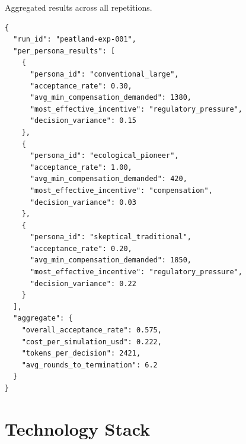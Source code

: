 \documentclass[12pt, a4paper]{article}
\begin{document}
Aggregated results across all repetitions.

\begin{lstlisting}[style=json, caption={Run summary with per-persona results.}, label={lst:runsummary}]
{
  "run_id": "peatland-exp-001",
  "per_persona_results": [
    {
      "persona_id": "conventional_large",
      "acceptance_rate": 0.30,
      "avg_min_compensation_demanded": 1380,
      "most_effective_incentive": "regulatory_pressure",
      "decision_variance": 0.15
    },
    {
      "persona_id": "ecological_pioneer",
      "acceptance_rate": 1.00,
      "avg_min_compensation_demanded": 420,
      "most_effective_incentive": "compensation",
      "decision_variance": 0.03
    },
    {
      "persona_id": "skeptical_traditional",
      "acceptance_rate": 0.20,
      "avg_min_compensation_demanded": 1850,
      "most_effective_incentive": "regulatory_pressure",
      "decision_variance": 0.22
    }
  ],
  "aggregate": {
    "overall_acceptance_rate": 0.575,
    "cost_per_simulation_usd": 0.222,
    "tokens_per_decision": 2421,
    "avg_rounds_to_termination": 6.2
  }
}
\end{lstlisting}

\section{Technology Stack}
\label{sec:techstack}
\end{document}
